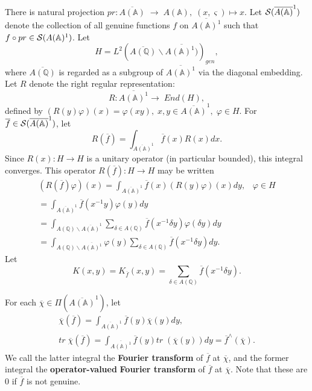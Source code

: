 There is natural projection
$pr:\overline{A({\mathbb{A}})}\;\rightarrow \;A({\mathbb{A}}),
\;(x,\varsigma )\longmapsto x$. Let
${\cal{S}}(\overline{A({\mathbb{A}})}^1)$
denote the collection of all genuine functions $f$ on
$\overline{A({\mathbb{A}})^1}$ such
that $f\circ pr\in {\cal{S}}(A({\mathbb{A}})^1)$. Let 
\[
H=
L^2(\overline{A({\mathbb{Q}})}\backslash \overline{A({\mathbb{A}})^1)})_{gen},
\]
where \emph{$\overline{A({\mathbb{Q}})}$} is regarded as a subgroup
of $\overline{A({\mathbb{A}})^1}$ via the
diagonal embedding. Let $R$ denote
the right regular representation: 
\[
R:\overline{A({\mathbb{A}})^1}\rightarrow \;End(H),
\]
defined by $(R(y)\varphi )(x)
=\varphi (xy),\;x,y\in \overline{A({\mathbb{A}})}^1,
\;\varphi \in H$.
For $\overline{f}\in {\cal{S}}(\overline{A({\mathbb{A}})}^1)$, let 
\[
R(\overline{f})=\int_{\overline{A({\mathbb{A}})}^1}\overline{f}(x)R(x)dx.
\]
Since $R(x):H\rightarrow H$ is a unitary operator (in particular bounded),
this integral converges. This
operator $R(\overline{f}):H\rightarrow H$ may be written 
\begin{equation}
\begin{array}{c}
(R(\overline{f})\varphi )(x)
=\int_{\overline{A({\mathbb{A}})}^1}\overline{f}(x)(R(y)\varphi )(x)dy,
\;\;\;\varphi \in H \\ 
=\int_{\overline{A({\mathbb{A}})}^1}\overline{f}(x^{-1}y)\varphi (y)dy \\ 
=\int_{A({\mathbb{Q}})\backslash \overline{A({\mathbb{A}})}^1}
\sum_{\delta \in A({\mathbb{Q}})}
\overline{f}(x^{-1}\delta y)\varphi (\delta y)dy \\ 
=\int_{A({\mathbb{Q}})\backslash \overline{A({\mathbb{A}})^1}}
\varphi (y)
\sum_{\delta \in A({\mathbb{Q}})}\overline{f}(x^{-1}\delta y)dy.
\end{array}
\end{equation}
Let 
\[
K(x,y)=K_{\overline{f}}(x,y)
=\sum_{\delta \in A({\mathbb{Q}})}
\overline{f}(x^{-1}\delta y).
\]

For each $\overline{\chi }\in \Pi (\overline{A({\mathbb{A}})}^1)$, let 
\begin{equation}
\begin{array}{c}
\overline{\chi }(\overline{f})
=\int_{\overline{A({\mathbb{A}})}^1}
\overline{f}(y)\overline{\chi }(y)dy, \\ 
tr\;\overline{\chi }(\overline{f})
=\int_{\overline{A({\mathbb{A}})^1}}\overline{f}(y)
tr\;(\overline{\chi }(y))dy
=\overline{f}^{\wedge }(\overline{\chi }).
\end{array}
\end{equation}
We call the latter integral the \textbf{Fourier transform}
of $\overline{f}$ at $\overline{\chi }$, and the
former integral the \textbf{operator-valued}
\textbf{Fourier transform} of $\overline{f}$ at
$\overline{\chi }$. Note that these are
$0$ if $\overline{f}$ is not genuine.

